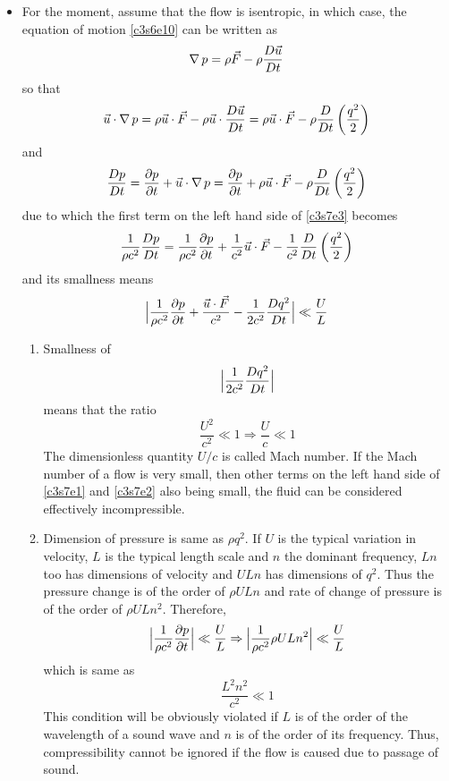 \begin{itemize}
\item For the moment, assume that the flow is isentropic, in which case, the equation of motion \eqref{c3s6e10} can be written as
\[
\operatorname{\nabla} p = \rho\vec{F} - \rho\frac{D{\vec{u}}}{Dt}
\]
so that
\[
\vec{u}\cdot\operatorname{\nabla} p = \rho\vec{u}\cdot\vec{F} - \rho\vec{u}\cdot\frac{D{\vec{u}}}{Dt} = \rho\vec{u}\cdot\vec{F} - \rho\frac{D}{Dt}\left(\frac{q^2}{2}\right)
\]
and
\[
\frac{D{p}}{Dt} = \frac{\partial{p}}{\partial{t}} + \vec{u}\cdot\operatorname{\nabla} p = \frac{\partial{p}}{\partial{t}} + \rho\vec{u}\cdot\vec{F} - \rho\frac{D}{Dt}\left(\frac{q^2}{2}\right)
\]
due to which the first term on the left hand side of \eqref{c3s7e3} becomes
\[
\frac{1}{\rho c^2}\frac{D{p}}{Dt} = \frac{1}{\rho c^2}\frac{\partial{p}}{\partial{t}} + \frac{1}{c^2}\vec{u}\cdot\vec{F} - \frac{1}{c^2}\frac{D}{Dt}\left(\frac{q^2}{2}\right)
\]
and its smallness means
\begin{equation}\label{c3s7e4}
\Big|\frac{1}{\rho c^2}\frac{\partial{p}}{\partial{t}} + \frac{\vec{u}\cdot\vec{F}}{c^2} - \frac{1}{2c^2}\frac{D{q^2}}{Dt} \Big| \ll \frac{U}{L}
\end{equation}
\begin{enumerate}
\item Smallness of 
\[
\Big|\frac{1}{2c^2}\frac{D{q^2}}{Dt} \Big|
\]
means that the ratio
\[
\frac{U^2}{c^2} \ll 1 \Rightarrow \frac{U}{c} \ll 1
\]
The dimensionless quantity $U/c$ is called Mach number. If the Mach number of a flow is very small, then other terms on the left hand side of \eqref{c3s7e1} and \eqref{c3s7e2} also
being small, the fluid can be considered effectively incompressible.

\item Dimension of pressure is same as $\rho q^2$. If $U$ is the typical variation in velocity, $L$ is the typical length scale and $n$ the dominant frequency, $Ln$ too has dimensions
of velocity and $ULn$ has dimensions of $q^2$. Thus the pressure change is of the order of $\rho UL n$ and rate of change of pressure is of the order of $\rho UL n^2$. Therefore,
\[
\Big|\frac{1}{\rho c^2}\frac{\partial{p}}{\partial{t}}\Big| \ll \frac{U}{L} \Rightarrow \Big|\frac{1}{\rho c^2}\rho UL n^2 \Big| \ll \frac{U}{L}
\]
which is same as
\begin{equation}\label{c3s7e5}
\frac{L^2n^2}{c^2} \ll 1
\end{equation}
This condition will be obviously violated if $L$ is of the order of the wavelength of a sound wave and $n$ is of the order of its frequency. Thus, compressibility cannot be ignored if
the flow is caused due to passage of sound.


\end{enumerate}
\end{itemize}
